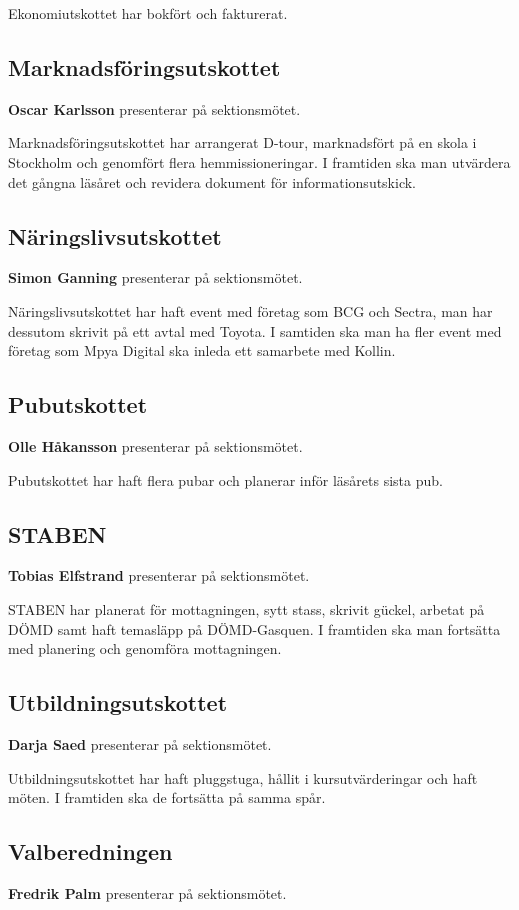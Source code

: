 \documentclass[../protokoll-vintermote-2024.tex]{subfiles}
\begin{document}
Ekonomiutskottet har bokfört och fakturerat.

\subsection{Marknadsföringsutskottet}
\textbf{Oscar Karlsson} presenterar på sektionsmötet.

Marknadsföringsutskottet har arrangerat D-tour, marknadsfört på en skola i Stockholm och genomfört flera hemmissioneringar. I framtiden ska man utvärdera det gångna läsåret och revidera dokument för informationsutskick.

\subsection{Näringslivsutskottet}
\textbf{Simon Ganning} presenterar på sektionsmötet.

Näringslivsutskottet har haft event med företag som BCG och Sectra, man har dessutom skrivit på ett avtal med Toyota. I samtiden ska man ha fler event med företag som Mpya Digital ska inleda ett samarbete med Kollin.

\subsection{Pubutskottet}
\textbf{Olle Håkansson} presenterar på sektionsmötet.

Pubutskottet har haft flera pubar och planerar inför läsårets sista pub.

\subsection{STABEN}
\textbf{Tobias Elfstrand} presenterar på sektionsmötet.

STABEN har planerat för mottagningen, sytt stass, skrivit gückel, arbetat på DÖMD samt haft temasläpp på DÖMD-Gasquen. I framtiden ska man fortsätta med planering och genomföra mottagningen.

\subsection{Utbildningsutskottet}
\textbf{Darja Saed} presenterar på sektionsmötet. 

Utbildningsutskottet har haft pluggstuga, hållit i kursutvärderingar och haft möten. I framtiden ska de fortsätta på samma spår.
 
\subsection{Valberedningen}
\textbf{Fredrik Palm} presenterar på sektionsmötet.
\end{document}

